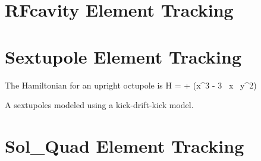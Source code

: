 \section{RFcavity Element Tracking}
\label{s:rfcavity.std}

\section{Sextupole Element Tracking}
\label{s:sextupole.std}

The Hamiltonian for an upright octupole is
\Begineq
  H =  +  (x^3 - 3 \, x \, y^2)
\Endeq

A sextupoles modeled using a kick-drift-kick model.

\section{Sol\_Quad Element Tracking}
\label{s:sol.quad.std}

